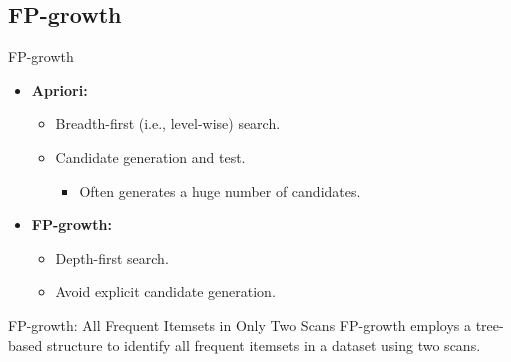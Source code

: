 \subsection{FP-growth}

\begin{frame}{FP-growth}
	\begin{itemize}
		\item \textbf{Apriori:}
		      \begin{itemize}
			      \item Breadth-first (i.e., level-wise) search.
			      \item Candidate generation and test.
			            \begin{itemize}
				            \item Often generates a huge number of candidates.
			            \end{itemize}
		      \end{itemize}
		\item \textbf{FP-growth:}
		      \begin{itemize}
			      \item Depth-first search.
			      \item Avoid explicit candidate generation.
		      \end{itemize}
	\end{itemize}

	\vspace{0.5cm}

	\begin{block}{FP-growth: All Frequent Itemsets in Only Two Scans}
		FP-growth employs a tree-based structure to identify all frequent itemsets in a dataset using two scans.
	\end{block}
\end{frame}

\newcommand{\fptreerootnode}{
	\begin{tikzpicture}
		\node[draw, fill=faugraydark!75, text=white, minimum height = 0.65cm, minimum width=1cm] at (0,-1) (Label) {$\{\}$};
	\end{tikzpicture}
}

\newcommand{\fptreenode}[2]{
	\begin{tikzpicture}
		\node[draw, fill=white, minimum height = 0.65cm, minimum width=0.5cm] at (0,-1) (Label) {$#1$};
		\node[draw, fill=faugraydark!75, text=white, minimum height = 0.65cm, minimum width=0.5cm, right = 0cm of Label] {$#2$};
	\end{tikzpicture}
}

